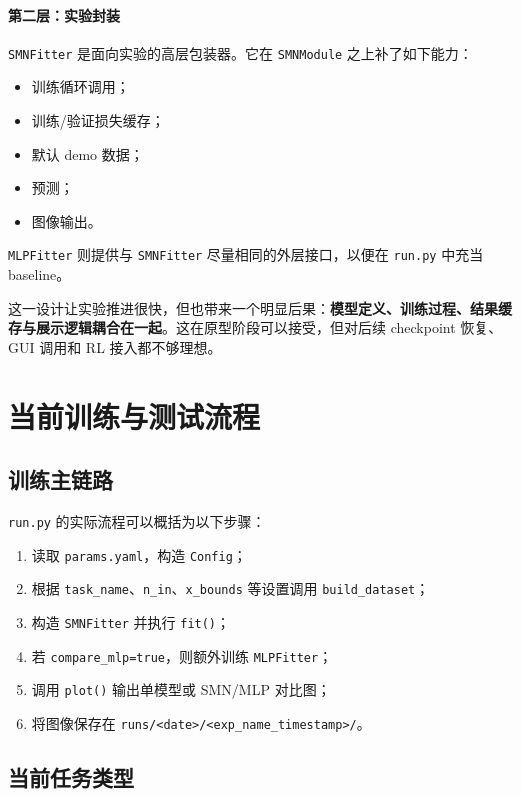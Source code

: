 \documentclass[11pt,fontset=none]{ctexart}
\begin{document}
\paragraph{第二层：实验封装}
\texttt{SMNFitter} 是面向实验的高层包装器。它在 \texttt{SMNModule} 之上补了如下能力：
\begin{itemize}[leftmargin=2em]
  \item 训练循环调用；
  \item 训练/验证损失缓存；
  \item 默认 demo 数据；
  \item 预测；
  \item 图像输出。
\end{itemize}

\texttt{MLPFitter} 则提供与 \texttt{SMNFitter} 尽量相同的外层接口，以便在 \texttt{run.py} 中充当 baseline。

这一设计让实验推进很快，但也带来一个明显后果：\textbf{模型定义、训练过程、结果缓存与展示逻辑耦合在一起}。这在原型阶段可以接受，但对后续 checkpoint 恢复、GUI 调用和 RL 接入都不够理想。

\section{当前训练与测试流程}

\subsection{训练主链路}

\texttt{run.py} 的实际流程可以概括为以下步骤：
\begin{enumerate}[leftmargin=2em]
  \item 读取 \texttt{params.yaml}，构造 \texttt{Config}；
  \item 根据 \texttt{task\_name}、\texttt{n\_in}、\texttt{x\_bounds} 等设置调用 \texttt{build\_dataset}；
  \item 构造 \texttt{SMNFitter} 并执行 \texttt{fit()}；
  \item 若 \texttt{compare\_mlp=true}，则额外训练 \texttt{MLPFitter}；
  \item 调用 \texttt{plot()} 输出单模型或 SMN/MLP 对比图；
  \item 将图像保存在 \texttt{runs/<date>/<exp\_name\_timestamp>/}。
\end{enumerate}

\subsection{当前任务类型}
\end{document}
